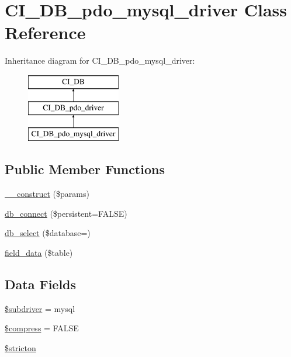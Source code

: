 \hypertarget{class_c_i___d_b__pdo__mysql__driver}{}\section{C\+I\+\_\+\+D\+B\+\_\+pdo\+\_\+mysql\+\_\+driver Class Reference}
\label{class_c_i___d_b__pdo__mysql__driver}
Inheritance diagram for C\+I\+\_\+\+D\+B\+\_\+pdo\+\_\+mysql\+\_\+driver\+:\begin{figure}[H]
\begin{center}
\leavevmode
\includegraphics[height=3.000000cm]{class_c_i___d_b__pdo__mysql__driver}
\end{center}
\end{figure}
\subsection*{Public Member Functions}
\begin{DoxyCompactItemize}
\item 
\mbox{\hyperlink{class_c_i___d_b__pdo__mysql__driver_a9162320adff1a1a4afd7f2372f753a3e}{\+\_\+\+\_\+construct}} (\$params)
\item 
\mbox{\hyperlink{class_c_i___d_b__pdo__mysql__driver_a52bf595e79e96cc0a7c907a9b45aeb4d}{db\+\_\+connect}} (\$persistent=F\+A\+L\+SE)
\item 
\mbox{\hyperlink{class_c_i___d_b__pdo__mysql__driver_a18ae9c21870b30b45337c5e3626190cc}{db\+\_\+select}} (\$database=\textquotesingle{}\textquotesingle{})
\item 
\mbox{\hyperlink{class_c_i___d_b__pdo__mysql__driver_a90355121e1ed009e0efdbd544ab56efa}{field\+\_\+data}} (\$table)
\end{DoxyCompactItemize}
\subsection*{Data Fields}
\begin{DoxyCompactItemize}
\item 
\mbox{\hyperlink{class_c_i___d_b__pdo__mysql__driver_a1322ca756348b11d080cb7a4f590de15}{\$subdriver}} = \textquotesingle{}mysql\textquotesingle{}
\item 
\mbox{\hyperlink{class_c_i___d_b__pdo__mysql__driver_abf799de0d30288b91ee73769281dd69d}{\$compress}} = F\+A\+L\+SE
\item 
\mbox{\hyperlink{class_c_i___d_b__pdo__mysql__driver_afb42d9811bec1da94506e5764e1439e0}{\$stricton}}
\end{DoxyCompactItemize}
